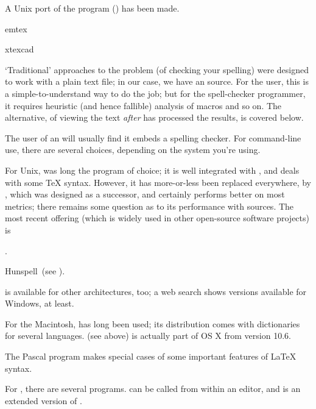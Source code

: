 A Unix port of the program () has been made.
\begin{ctanrefs}
\item[emtex]
\item[xtexcad]
\end{ctanrefs}


`Traditional' approaches to the problem (of checking your spelling) were
designed to work with a plain text file; in our case, we have an \alltex{}
source.  For the user, this is a simple-to-understand way to do the
job; but for the spell-checker programmer, it requires heuristic (and
hence fallible) analysis of \alltex{} macros and so on.  The
alternative, of viewing the text \emph{after} \alltex{} has processed
the results, is covered below.

The user of an  will usually find it
embeds a spelling checker.  For command-line use, there are several
choices, depending on the system you're using.

For Unix,  was long the program of choice; it is well
integrated with , and deals with some \TeX{} syntax.
However, it has more-or-less been replaced everywhere, by
, which was designed as a successor, and certainly
performs better on most metrics; there remains some question as to its
performance with \AllTeX{} sources.  The most recent offering (which
is widely used in other open-source software projects) is
\begin{hyperversion}
  \href{http://hunspell.sourceforge.net/}{}.
\end{hyperversion}
\begin{flatversion}
  Hunspell~(see ).
\end{flatversion}
 is available for other architectures, too; a web
search shows versions available for Windows, at least.

For the Macintosh,  has long been used; its
distribution comes with dictionaries for several languages.
 (see above) is actually part of OS X from version 10.6.

The  Pascal program  makes special cases of
some important features of \LaTeX{} syntax.

For \MSDOS{}, there are several programs.   can be
called from within an editor, and  is an extended
version of .

